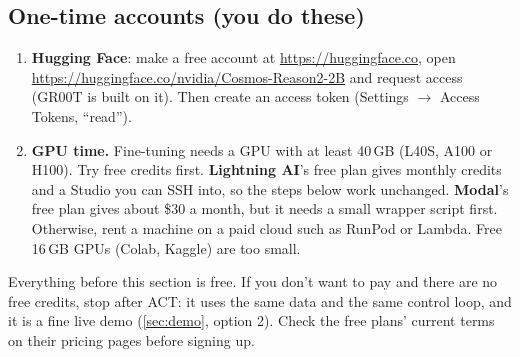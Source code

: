 \documentclass[11pt]{article}
\begin{document}
\subsection{One-time accounts (you do these)}
\begin{enumerate}
\item \textbf{Hugging Face}: make a free account at \url{https://huggingface.co}, open
  \url{https://huggingface.co/nvidia/Cosmos-Reason2-2B} and request access (GR00T is built on
  it). Then create an access token (Settings $\rightarrow$ Access Tokens, ``read'').
\item \textbf{GPU time.} Fine-tuning needs a GPU with at least 40\,GB (L40S, A100 or H100).
  Try free credits first. \textbf{Lightning AI}'s free plan gives monthly credits and a
  Studio you can SSH into, so the steps below work unchanged. \textbf{Modal}'s free plan gives
  about \$30 a month, but it needs a small wrapper script first. Otherwise, rent a machine
  on a paid cloud such as RunPod or Lambda. Free 16\,GB GPUs (Colab, Kaggle) are too small.
\end{enumerate}

\begin{note}
Everything before this section is free. If you don't want to pay and there are no free
credits, stop after ACT: it uses the same data and the same control loop, and it is a
fine live demo (\cref{sec:demo}, option 2). Check the free plans' current terms on their
pricing pages before signing up.
\end{note}
\end{document}
